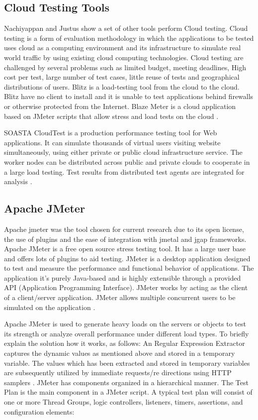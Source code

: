 \documentclass[espaco=umemeio,chapter=TITLE,twoside,openright]{abnt}
\begin{document}
\subsection{Cloud Testing Tools}

Nachiyappan and Justus show a set of other tools perform Cloud testing. Cloud testing is a form of evaluation methodology in which the applications to be tested uses cloud as a computing environment and its infrastructure to simulate real world traffic by using existing cloud computing technologies. Cloud testing are challenged by several problems such as limited budget, meeting deadlines, High cost per test, large number of test cases, little reuse of tests and geographical distributions of users.  Blitz is a load-testing tool from the cloud to the cloud. Blitz have no client to install and it is unable to test applications behind firewalls or otherwise protected from the Internet. Blaze Meter is a cloud application based on JMeter scripts that allow stress and load tests on the cloud \cite{Nachiyappan2015}.

SOASTA CloudTest is a production performance testing
tool for Web applications. It can simulate thousands of virtual users visiting website simultaneously, using either private or public cloud infrastructure service. The worker nodes can be distributed across public and private clouds to cooperate in a large load testing. Test results from distributed test agents are
integrated for analysis \cite{Bai2011a}.

\subsection{Apache JMeter}

Apache jmeter was the tool chosen for current research due to its open license, the use of plugins and the ease of integration with jmetal and jgap frameworks. Apache JMeter is a free open source stress testing tool.  It has a large user base and offers lots of plugins to aid testing. JMeter is a desktop application designed to test and measure the performance and functional behavior of applications. The application it's purely Java-based and is highly extensible through a provided API (Application Programming Interface). JMeter works by acting as the client of a client/server application. JMeter allows multiple concurrent users to be simulated on the application \cite{Halili2008} \cite{Erinle2013}.

Apache JMeter is used to generate heavy loads on the servers or objects to test its strength or analyze overall performance under different load types. To briefly explain the solution how it works, as follows: An Regular Expression Extractor captures the dynamic values as mentioned above and stored in a temporary variable. The values which has been extracted and stored in temporary variables are subsequently utilized by immediate requests/re directions using HTTP samplers \cite{Kiran2015}. JMeter has components organized  in a hierarchical manner. The Test Plan is the main component in a JMeter script. A typical test plan will consist of one or more Thread Groups, logic controllers, listeners, timers, assertions, and configuration elements:
\end{document}
